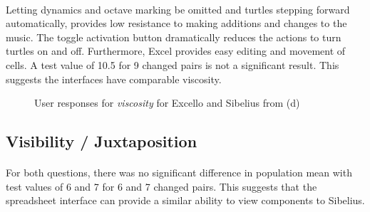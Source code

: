 \paragraph{} Letting dynamics and octave marking be omitted and turtles stepping forward automatically, provides low resistance to making additions and changes to the music. The toggle activation button dramatically reduces the actions to turn turtles on and off. Furthermore, Excel provides easy editing and movement of cells. A test value of 10.5 for 9 changed pairs is not a significant result. This suggests the interfaces have comparable viscosity.

\begin{figure}[tbh]
\caption{User responses for \textit{viscosity} for Excello and Sibelius from (d)}
\label{evaluation:visc}
\end{figure}

\subsection{Visibility / Juxtaposition}

\paragraph{} For both questions, there was no significant difference in population mean with test values of 6 and 7 for 6 and 7 changed pairs. This suggests that the spreadsheet interface can provide a similar ability to view components to Sibelius.

